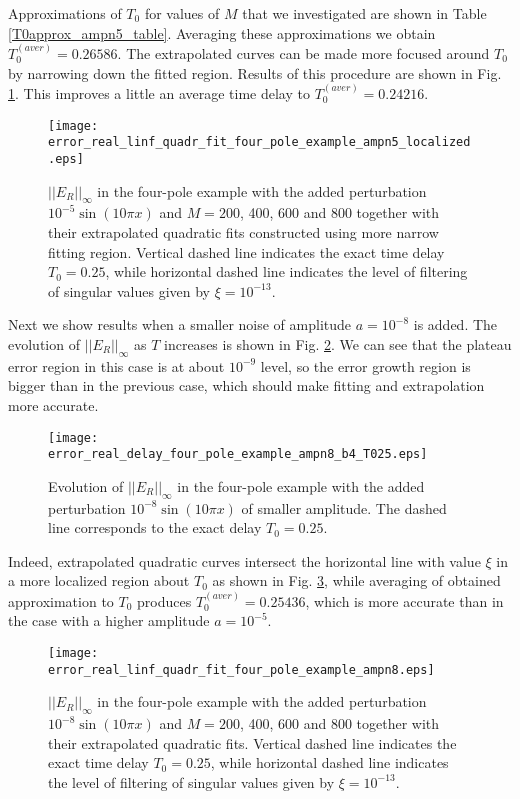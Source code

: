 \documentclass[journal,twoside]{IEEEtran}
\begin{document}
Approximations of $T_0$ for values of $M$ that we investigated are shown in Table \ref{T0approx_ampn5_table}.
Averaging these approximations we obtain  $T_0^{(aver)}=0.26586$. The extrapolated curves can be made more focused around $T_0$ by narrowing down the fitted region. Results of this procedure are  shown in Fig. \ref{Ffour_pole6_2}. This improves a little an average time delay to $T_0^{(aver)}=0.24216$.
\begin{figure}[h] \begin{center}
\texttt{[image: error\_real\_linf\_quadr\_fit\_four\_pole\_example\_ampn5\_localized.eps]}
\end{center}
\caption{$||E_R||_\infty$ in the four-pole example  with  the added perturbation $10^{-5}\sin(10\pi x)$  and $M=200$, 400, 600 and 800  together with their extrapolated quadratic fits constructed using more narrow fitting region. Vertical dashed line indicates the exact time delay $T_0=0.25$, while horizontal dashed line indicates the level of filtering of singular values given by $\xi=10^{-13}$.}
\label{Ffour_pole6_2}
\end{figure}

Next we show results when a smaller noise of amplitude $a=10^{-8}$ is added. The evolution of $||E_R||_\infty$ as $T$ increases is shown in Fig. \ref{Ffour_pole7}. We can see that the plateau error region in this case is at about $10^{-9}$ level, so the error growth region is bigger than in the previous case, which should make fitting and extrapolation more accurate.
\begin{figure}[h] \begin{center}
\texttt{[image: error\_real\_delay\_four\_pole\_example\_ampn8\_b4\_T025.eps]}
\end{center}
\caption{Evolution of $||E_R||_\infty$  in the four-pole example with the added  perturbation $10^{-8}\sin(10\pi x)$ of smaller amplitude. The dashed line corresponds to the exact delay $T_0=0.25$.} 
\label{Ffour_pole7}
\end{figure}
Indeed, extrapolated quadratic curves intersect the horizontal line with value $\xi$ in a more localized region about $T_0$ as shown in Fig. \ref{Ffour_pole8}, while averaging of obtained approximation to $T_0$ produces $T_0^{(aver)}=0.25436$, which is more accurate than  in the case with a higher amplitude $a=10^{-5}$.

\begin{figure}[h] \begin{center}
\texttt{[image: error\_real\_linf\_quadr\_fit\_four\_pole\_example\_ampn8.eps]}
\end{center}
\caption{$||E_R||_\infty$ in the four-pole example  with  the added perturbation $10^{-8}\sin(10\pi x)$  and $M=200$, 400, 600 and 800  together with their extrapolated quadratic fits. Vertical dashed line indicates the exact time delay $T_0=0.25$, while horizontal dashed line indicates the level of filtering of singular values given by $\xi=10^{-13}$.}
\label{Ffour_pole8}
\end{figure}
\end{document}
